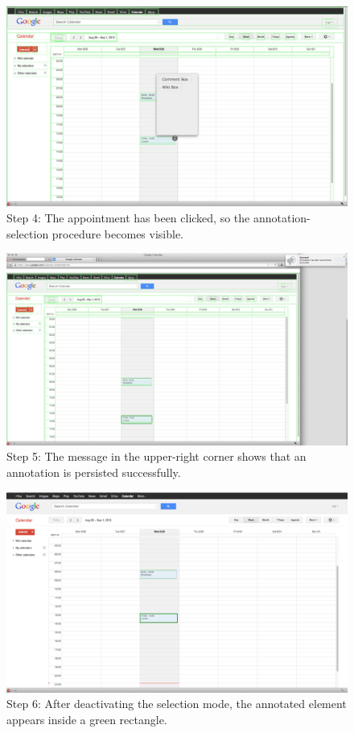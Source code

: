 \begin{figure}\centering
		\includegraphics[width=13cm]{images/gcal-screenshot-walkthrough/gcal-wt-4.png}
		\caption{Step 4: The appointment has been clicked, so the annotation-selection procedure becomes visible.}
		\label{gcal-wt-4}
\end{figure} 

\begin{figure}\centering
		\includegraphics[width=13cm]{images/gcal-screenshot-walkthrough/gcal-wt-5.png}
		\caption{Step 5: The message in the upper-right corner shows that an annotation is persisted successfully.}
		\label{gcal-wt-5}
\end{figure} 

\begin{figure}\centering
		\includegraphics[width=13cm]{images/gcal-screenshot-walkthrough/gcal-wt-6.png}
		\caption{Step 6: After deactivating the selection mode, the annotated element appears inside a green rectangle.}
		\label{gcal-wt-6}
\end{figure} 

